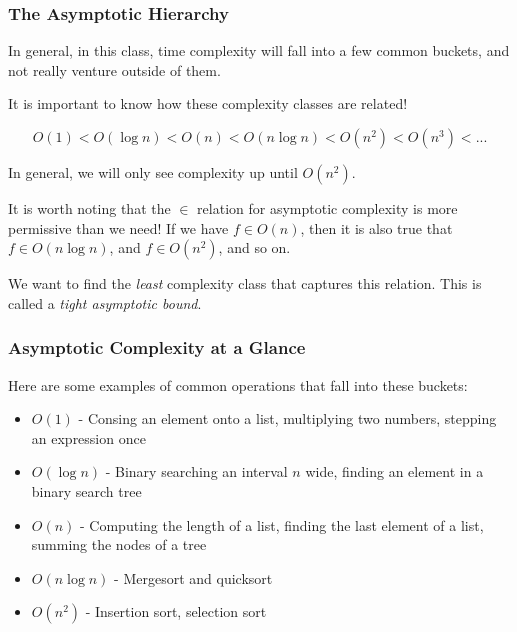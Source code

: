 \documentclass[aspectratio=169]{beamer}
\begin{document}
\begin{frame}[fragile]
  \frametitle{The Asymptotic Hierarchy}

  In general, in this class, time complexity will fall into a few common buckets,
  and not really venture outside of them.

  \pause
  \vspace{\fill}

  It is important to know how these complexity classes are related!

  $$O(1) < O(\log n) < O(n) < O(n \log n) < O(n^2) < O(n^3) < ...$$

  \vspace{\fill}

  In general, we will only see complexity up until $O(n^2)$.

  \pause
  \vspace{\fill}

  It is worth noting that the $\in$ relation for asymptotic complexity is more
  permissive than we need! If we have $f \in O(n)$, then it is also true that
  $f \in O(n \log n)$, and $f \in O(n^2)$, and so on.

  \pause
  \vspace{\fill}

  We want to find the \textit{least} complexity class that captures this relation.
  This is called a \textit{tight asymptotic bound}.
\end{frame}

\begin{frame}[fragile]
  \frametitle{Asymptotic Complexity at a Glance}

  Here are some examples of common operations that fall into these buckets:

  \pause
  \vspace{\fill}

  \begin{itemize}
    \item $O(1)$ - Consing an element onto a list, multiplying two numbers,
    stepping an expression once \pause
    \item $O(\log n)$ - Binary searching an interval $n$ wide, finding an
    element in a binary search tree \pause
    \item $O(n)$ - Computing the length of a list, finding the last element
    of a list, summing the nodes of a tree \pause
    \item $O(n \log n)$ - Mergesort and quicksort \pause
    \item $O(n^2)$ - Insertion sort, selection sort
  \end{itemize}

\end{frame}
\end{document}
